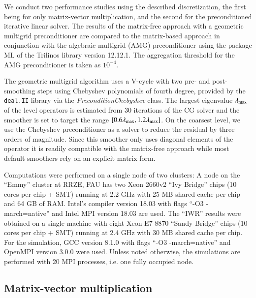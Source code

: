 \documentclass[times,doublespace]{nmeauth}
\newcommand{\changeDD}[1]{#1}
\newcommand{\changeJP}[1]{#1}
\begin{document}
%
%
\changeJP{We conduct two performance studies using the described discretization, the first being for only matrix-vector multiplication, and the second for the preconditioned iterative linear solver.}
The results of the matrix-free approach with a geometric multigrid preconditioner are compared to the matrix-based approach in conjunction with the algebraic multigrid (AMG) preconditioner using the package ML \cite{Gee2006a} of the Trilinos \cite{Heroux2005} library version 12.12.1.
The aggregation threshold for the AMG preconditioner is taken as $10^{-4}$.
\changeDD{
The geometric multigrid algorithm uses a V-cycle with two pre- and post-smoothing steps using Chebyshev polynomials \cite{Varga2009} of fourth degree, provided
by the \texttt{deal.II} library via the \textit{PreconditionChebyshev} class.
The largest eigenvalue $\lambda_{\rm{max}}$ of the level operators is estimated from $30$ iterations of the CG solver and the smoother
is set to target the range $[0.6\lambda_{\rm{max}}, 1.2\lambda_{\rm{max}}]$.
On the coarsest level, we use \changeDD{the Chebyshev preconditioner as a solver \cite{Varga2009}} to reduce the residual by three orders of magnitude.
Since this smoother only uses diagonal elements of the operator it is readily compatible with the matrix-free approach while most default smoothers rely on an explicit matrix form.}

Computations \changeJP{were performed} on a single node of two clusters:
A node on the ``Emmy'' cluster at RRZE, FAU has two Xeon 2660v2 ``Ivy Bridge'' chips (10 cores per chip + SMT) running at 2.2 GHz with 25 MB shared cache per chip and 64 GB of RAM. Intel's compiler version 18.03 with flags ``-O3 -march=native'' and Intel MPI version 18.03 are used.
The ``IWR'' results were obtained on a single machine with eight Xeon E7-8870 ``Sandy Bridge'' chips (10 cores per chip  + SMT) running at 2.4 GHz with 30 MB shared cache per chip. For the simulation, GCC version 8.1.0 with flags ``-O3 -march=native'' and OpenMPI version 3.0.0 were used.
\changeDD{Unless noted otherwise, the simulations are performed with 20 MPI processes, i.e. \changeJP{one} fully occupied node.}

\subsection{Matrix-vector multiplication}
\end{document}
